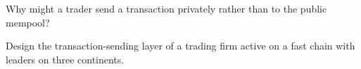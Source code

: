 \begin{interviewq}\label{iq:nw:on-chain-connectivity:5}
Why might a trader send a transaction privately rather than to the public mempool?
\end{interviewq}

\begin{interviewq}\label{iq:nw:on-chain-connectivity:6}
Design the transaction-sending layer of a trading firm active on a fast chain with leaders on three continents.
\end{interviewq}
